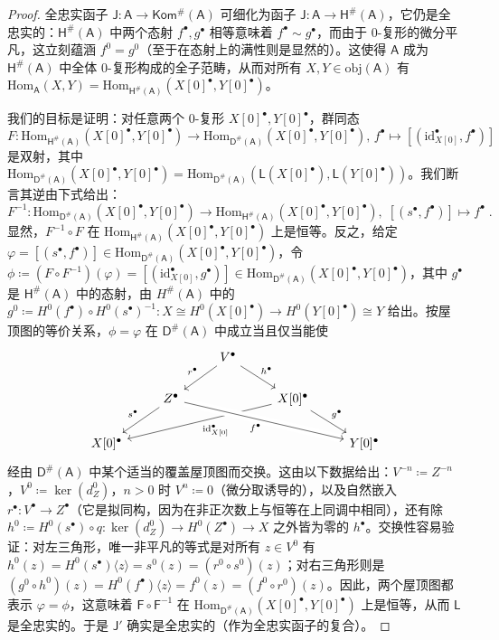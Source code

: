 \begin{proof}
	全忠实函子 $\mathsf{J}:\mathsf{A}\rightarrow\mathsf{Kom^\#\!(A)}$ 可细化为函子 $\mathsf{J}:\mathsf{A}\rightarrow\mathsf{H^\#\!(A)}$，它仍是全忠实的：$\mathsf{H^\#\!(A)}$ 中两个态射 $f^\bullet,g^\bullet$ 相等意味着 $f^\bullet\sim g^\bullet$，而由于 0-复形的微分平凡，这立刻蕴涵 $f^0=g^0$（至于在态射上的满性则是显然的）。这使得 $\mathsf{A}$ 成为 $\mathsf{H^\#\!(A)}$ 中全体 0-复形构成的全子范畴，从而对所有 $X,Y\in\text{obj}(\mathsf{A})$ 有 $\text{Hom}_\mathsf{A}(X,Y)=\text{Hom}_\mathsf{H^\#\!(A)}(X[0]^\bullet,Y[0]^\bullet)$。
	
	我们的目标是证明：对任意两个 0-复形 $X[0]^\bullet, Y[0]^\bullet$，群同态
	\[
	F:\text{Hom}_\mathsf{H^\#\!(A)}(X[0]^\bullet,Y[0]^\bullet)\rightarrow\text{Hom}_\mathsf{D^\#\!(A)}(X[0]^\bullet,Y[0]^\bullet),\,f^\bullet\mapsto [(\text{id}_{X[0]}^\bullet,f^\bullet)]
	\]
	是双射，其中 $\text{Hom}_\mathsf{D^\#\!(A)}(X[0]^\bullet,Y[0]^\bullet)=\text{Hom}_\mathsf{D^\#\!(A)}(\mathsf{L}(X[0]^\bullet),\mathsf{L}(Y[0]^\bullet))$。我们断言其逆由下式给出：
	\[
	F^{-1}:\text{Hom}_\mathsf{D^\#\!(A)}(X[0]^\bullet,Y[0]^\bullet)\rightarrow\text{Hom}_\mathsf{H^\#\!(A)}(X[0]^\bullet,Y[0]^\bullet),\; [(s^\bullet,f^\bullet)]\mapsto f^\bullet\;.
	\]
	显然，$F^{-1}\circ F$ 在 $\text{Hom}_\mathsf{H^\#\!(A)}(X[0]^\bullet,Y[0]^\bullet)$ 上是恒等。反之，给定 $\varphi=[(s^\bullet,f^\bullet)]\in\text{Hom}_\mathsf{D^\#\!(A)}(X[0]^\bullet,Y[0]^\bullet)$，令 $\phi\coloneqq (F\circ F^{-1})(\varphi)=[(\text{id}_{X[0]}^\bullet,g^\bullet)]\in\text{Hom}_\mathsf{D^\#\!(A)}(X[0]^\bullet,Y[0]^\bullet)$，其中 $g^\bullet$ 是 $\mathsf{H^\#\!(A)}$ 中的态射，由 $H^\#\!(\mathsf{A})$ 中的 $g^0\coloneqq H^0(f^\bullet)\circ H^0(s^\bullet)^{-1}:X\cong H^0(X[0]^\bullet)\rightarrow H^0(Y[0]^\bullet)\cong Y$ 给出。按屋顶图的等价关系，$\phi=\varphi$ 在 $\mathsf{D^\#\!(A)}$ 中成立当且仅当能使
	\[
	\begin{tikzcd}
		& & V^\bullet\arrow[dl, "r^\bullet"']\arrow[dr, "h^\bullet"] & & \\
		& Z^\bullet\arrow[dl, "s^\bullet"'] & & X[0]^\bullet\arrow[dlll, "{\text{id}_{X[0]}^\bullet}"]\arrow[dr, "g^\bullet"] & \\
		X[0]^\bullet & & & & Y[0]^\bullet\arrow[from=ulll, crossing over, "f^\bullet"'] 
	\end{tikzcd}
	\]
	经由 $\mathsf{D^\#\!(A)}$ 中某个适当的覆盖屋顶图而交换。这由以下数据给出：$V^{-n}\coloneqq Z^{-n}$，$V^0\coloneqq\ker(d_Z^0)$，$n>0$ 时 $V^n\coloneqq 0$（微分取诱导的），以及自然嵌入 $r^\bullet:V^\bullet\rightarrow Z^\bullet$（它是拟同构，因为在非正次数上与恒等在上同调中相同），还有除 $h^0\coloneqq H^0(s^\bullet)\circ q: \ker(d_Z^0)\rightarrow H^0(Z^\bullet)\rightarrow X$ 之外皆为零的 $h^\bullet$。交换性容易验证：对左三角形，唯一非平凡的等式是对所有 $z\in V^0$ 有 $h^0(z)=H^0(s^\bullet)\langle z\rangle=s^0(z)=(r^0\circ s^0)(z)$；对右三角形则是 $(g^0\circ h^0)(z)=H^0(f^\bullet)\langle z\rangle=f^0(z)=(f^0\circ r^0)(z)$。因此，两个屋顶图都表示 $\varphi=\phi$，这意味着 $\mathsf{F}\circ\mathsf{F}^{-1}$ 在 $\text{Hom}_\mathsf{D^\#\!(A)}(X[0]^\bullet,Y[0]^\bullet)$ 上是恒等，从而 $\mathsf{L}$ 是全忠实的。于是 $\mathsf{J}'$ 确实是全忠实的（作为全忠实函子的复合）。
	

\end{proof}
